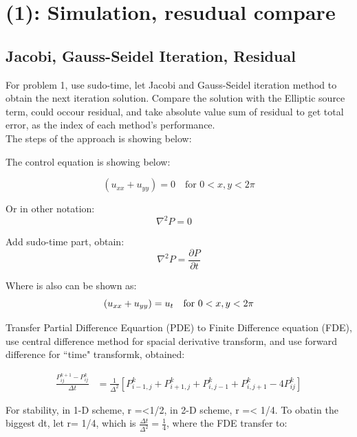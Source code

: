 \documentclass[12pt]{article}
\begin{document}



\section{(1): Simulation, resudual compare}
\subsection{Jacobi, Gauss-Seidel Iteration, Residual}
For problem 1, use sudo-time, let Jacobi and Gauss-Seidel iteration 
method to obtain the next iteration solution. Compare the solution 
with the Elliptic source term, could occour residual, and take absolute
value sum of residual to get total error, as the index of each
method's performance.\\

The steps of the approach is showing below:

The control equation is showing below:

\begin{equation*}
    (u_{xx} + u_{yy}) = 0 \quad \text{for } 0 < x,y < 2\pi
\end{equation*}

Or in other notation: $$\nabla^2 P = 0 \quad $$


Add sudo-time part, obtain:
$$\nabla^2 P = \frac{\partial P}{\partial t}$$


Where is also can be shown as: 
\begin{equation*}
    (u_{xx} + u_{yy}) = u_{t} \quad \text{for } 0 < x,y < 2\pi\\
\end{equation*}

Transfer Partial Difference Equartion (PDE) to Finite Difference equation
(FDE), use central difference method for spacial derivative transform, and
use forward difference for ``time" transformk, obtained:

\begin{align*}
    \frac{P_{ij}^{k+1} - P_{ij}^k}{\Delta t} &= \frac{1}{\Delta^2} \left[ P_{i-1,j}^k + P_{i+1,j}^k + P_{i,j-1}^k + P_{i,j+1}^k - 4P_{ij}^k \right]
\end{align*}

For stability, in 1-D scheme, r =<1/2, in 2-D scheme, r =< 1/4.
To obatin the biggest dt, let r= 1/4, which is $\frac{\Delta t}{\Delta^2} = \frac{1}{4}$,
where the FDE transfer to:
\end{document}

